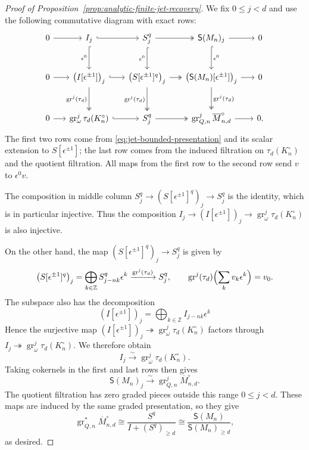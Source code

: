 \documentclass[11pt]{article}
\theoremstyle{definition}
\newcommand{\gr}{\operatorname{gr}}
\begin{document}
\begin{proof}[Proof of Proposition~\ref{prop:analytic-finite-jet-recovery}]
We fix $0\leq j<d$ and use the following commutative diagram
with exact rows:
\[
\begin{tikzcd}[column sep=1.5em,row sep=large]
 0\arrow[r]
 &I_j\arrow[r,hook]\arrow[d,hook,"\epsilon^0"']
 &S_j^{q}\arrow[r,two heads]\arrow[d,hook,"\epsilon^0"']
 &\mathsf S(M_n)_j\arrow[r]\arrow[d,hook,"\epsilon^0"]&0\\
 0\arrow[r]
 &\bigl(I[\epsilon^{\pm1}]\bigr)_j\arrow[r,hook]
    \arrow[d,two heads,"\gr^j(\tau_d)"']
 &\bigl(S[\epsilon^{\pm1}]^{q}\bigr)_j\arrow[r,two heads]
    \arrow[d,two heads,"\gr^j(\tau_d)"']
 &\bigl(\mathsf S(M_n)[\epsilon^{\pm1}]\bigr)_j\arrow[r]
    \arrow[d,two heads,"\gr^j(\tau_d)"]&0\\
 0\arrow[r]
 &\gr_\omega^j\tau_d(K_n^\circ)\arrow[r,hook]
 &S_j^{q}\arrow[r,two heads]
 &\gr_{Q,n}^j\overline M_{n,d}^\circ\arrow[r]&0.
\end{tikzcd}
\]
The first two rows come from \eqref{eq:jet-bounded-presentation}
and its scalar extension to $S[\epsilon^{\pm1}]$; the last row comes from the
induced filtration on $\tau_d(K_n^\circ)$ and the quotient filtration.
All maps from the first row to the second row send $v$ to $\epsilon^0v$.

The composition in middle column $S_j^{q}\to(S[\epsilon^{\pm1}]^{q})_j\to S_j^{q}$ is the identity,
which is in particular injective. Thus the composition $I_j\to(I[\epsilon^{\pm1}])_j\to\gr_{\omega}^j\tau_d(K_n^\circ)$ is also injective. 

On the other hand, the map $(S[\epsilon^{\pm1}]^{q})_j\to S_j^{q}$
is given by
\[
 \bigl(S[\epsilon^{\pm1}]^{q}\bigr)_j
 =\bigoplus_{k\in\mathbb Z}S_{j-nk}^{q}\epsilon^k\xrightarrow{\gr^j(\tau_d)}S_j^{q},
 \qquad
 \gr^j(\tau_d)\Bigl(\sum_kv_k\epsilon^k\Bigr)=v_0.
\]
The subspace also has the decomposition \[(I[\epsilon^{\pm1}])_j=\bigoplus_{k\in\mathbb Z}I_{j-nk}\epsilon^k\]
Hence the surjective map $(I[\epsilon^{\pm1}])_j\twoheadrightarrow\gr_{\omega}^j\tau_d(K_n^\circ)$ factors through 
\(I_j\twoheadrightarrow\gr_{\omega}^j\tau_d(K_n^\circ).\)
We therefore obtain
\[
 I_j\xrightarrow{\sim}\gr_\omega^j\tau_d(K_n^\circ).
\]
Taking cokernels in the first and last rows then gives
\[
 \mathsf S(M_n)_j\xrightarrow{\sim}
 \gr_{Q,n}^j\overline M_{n,d}^\circ.
\]
The quotient filtration has zero graded pieces outside this range $0\le j<d$.
These maps are induced by the same graded presentation, so they give
\[
 \gr_{Q,n}^*\overline M_{n,d}^\circ
 \cong\frac{S^{q}}{I+(S^{q})_{\geq d}}
 \cong\frac{\mathsf S(M_n)}{\mathsf S(M_n)_{\geq d}},
\]
as desired.
\end{proof}
\end{document}
